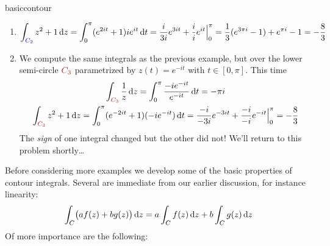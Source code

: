 \begin{examples}{}{basiccontour}
\begin{enumerate}
	  \item[]
	  \[
	  	\int_{\textcolor{blue}{C_2}}z^2+1\,{\mathrm{d} z} =\int_0^{\pi}(e^{2it}+1)ie^{it}\,{\mathrm{d} t} =\frac i{3i}e^{3it}+\frac i{i}e^{it}\Big|_0^{\pi}= \frac 13(e^{3\pi i}-1)+e^{\pi i}-1=-\frac 83
	  \]
	  \item We compute the same integrals as the previous example, but over the lower semi-circle $\textcolor{Brown}{C_3}$ parametrized by $z(t)=e^{-it}$ with $t\in[0,\pi]$. This time
	  \begin{gather*}
	  	\int_{\textcolor{Brown}{C_3}}\frac 1z\,\dz =\int_0^{\pi}\frac{-ie^{-it}}{e^{-it}}\,\dt =-\pi i\\
	  	\int_{\textcolor{Brown}{C_3}}z^2+1\,\dz =\int_0^{\pi}(e^{-2it}+1)(-ie^{-it})\,\dt =\frac{-i}{-3i}e^{-3it}+\frac{-i}{-i}e^{-it}\Big|_0^{\pi}=-\frac 83
	  \end{gather*}
	  The \emph{sign} of one integral changed but the other did not! We'll return to this problem shortly\ldots
	\end{enumerate}
\end{examples}


Before considering more examples we develop some of the basic properties of contour integrals. Several are immediate from our earlier discussion, for instance linearity:
\[
	\int_C\bigl(af(z)+bg(z)\bigr)\,{\mathrm{d} z}=a\int_Cf(z)\,{\mathrm{d} z}+b\int_Cg(z)\,{\mathrm{d} z}
\]
Of more importance are the following:

